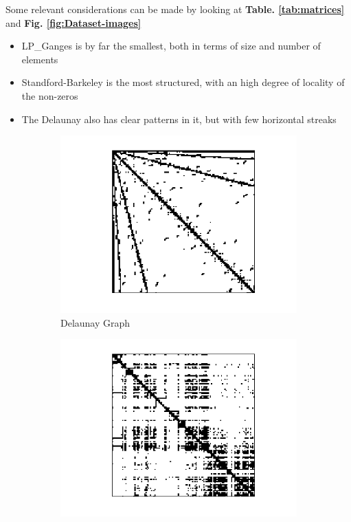 \documentclass[conference]{IEEEtran}
\begin{document}
Some relevant considerations can be made by looking at \textbf{Table. \ref{tab:matrices}} and \textbf{Fig. \ref{fig:Dataset-images}}
\begin{itemize}
    \item LP\_Ganges is by far the smallest, both in terms of size and number of elements
    \item Standford-Barkeley is the most structured, with an high degree of locality of the non-zeros
    \item The Delaunay also has clear patterns in it, but with few horizontal streaks
\end{itemize}

\begin{figure}
    \centering
    \begin{subfigure}[b]{0.45\linewidth}
        \includegraphics[width=\linewidth]{images/delaunay_n23.png}
        \caption{Delaunay Graph}
        \label{fig:delaunay_n23}
    \end{subfigure}
    \hfill
    \begin{subfigure}[b]{0.45\linewidth}
        \includegraphics[width=\linewidth]{images/Stanford_Berkeley.png}

\end{subfigure}
\end{figure}
\end{document}
